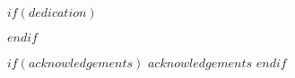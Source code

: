 \documentclass[12pt,final,CPage]{ufthesis} %
\begin{document}






\maketitle 
\makecopyright


$if(dedication)$
	\dedication{$dedication$}
$endif$ %


$if(acknowledgements)$
	$acknowledgements$
$endif$ %



\end{document}
